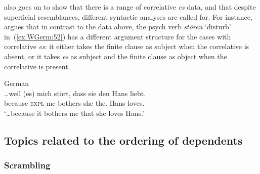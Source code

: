 \documentclass[output=paper,hidelinks]{langscibook}
\begin{document}
\citet{Berman2003} also goes on to show that there is a range of
correlative \textit{es} data, and that despite superficial
resemblances, different syntactic analyses are called for. For
instance, \citeauthor{Berman2003} argues that in contrast to the data
above, the psych verb \textit{stören} `disturb' in~(\ref{ex:WGerm:52}) has a
different argument structure for the cases with correlative
\textit{es}: it either takes the finite clause as subject when the
correlative is absent, or it takes \textit{es} as subject and the
finite clause as object when the correlative is present.
%
\begin{exe}
  \ex\label{ex:WGerm:52} German \citep[§8.1, example 2d]{Berman2003}\\
      {\gll
        \ldots{}weil (es) mich stört, dass sie den Hans liebt.\\
        \phantom{\ldots}because \phantom{(}\textsc{expl} me bothers \COMP{} she the.\ACC{} Hans loves.\\
        \glt `\ldots because it bothers me that she loves Hans.'}
\end{exe}


\subsection{Topics related to the ordering of dependents\label{sec:Germanic:ordering}}

\subsubsection{Scrambling\label{sec:Germanic:scrambling}}
\end{document}
